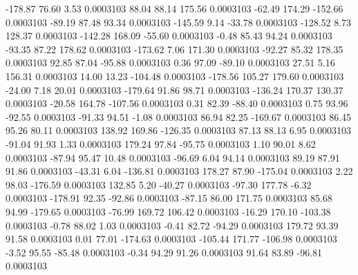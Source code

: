      -178.87       76.60        3.53     0.0003103
       88.04       88.14      175.56     0.0003103
      -62.49      174.29     -152.66     0.0003103
      -89.19       87.48       93.34     0.0003103
     -145.59        9.14      -33.78     0.0003103
     -128.52        8.73      128.37     0.0003103
     -142.28      168.09      -55.60     0.0003103
       -0.48       85.43       94.24     0.0003103
      -93.35       87.22      178.62     0.0003103
     -173.62        7.06      171.30     0.0003103
      -92.27       85.32      178.35     0.0003103
       92.85       87.04      -95.88     0.0003103
        0.36       97.09      -89.10     0.0003103
       27.51        5.16      156.31     0.0003103
       14.00       13.23     -104.48     0.0003103
     -178.56      105.27      179.60     0.0003103
      -24.00        7.18       20.01     0.0003103
     -179.64       91.86       98.71     0.0003103
     -136.24      170.37      130.37     0.0003103
      -20.58      164.78     -107.56     0.0003103
        0.31       82.39      -88.40     0.0003103
        0.75       93.96      -92.55     0.0003103
      -91.33       94.51       -1.08     0.0003103
       86.94       82.25     -169.67     0.0003103
       86.45       95.26       80.11     0.0003103
      138.92      169.86     -126.35     0.0003103
       87.13       88.13        6.95     0.0003103
      -91.04       91.93        1.33     0.0003103
      179.24       97.84      -95.75     0.0003103
        1.10       90.01        8.62     0.0003103
      -87.94       95.47       10.48     0.0003103
      -96.69        6.04       94.14     0.0003103
       89.19       87.91       91.86     0.0003103
      -43.31        6.04     -136.81     0.0003103
      178.27       87.90     -175.04     0.0003103
        2.22       98.03     -176.59     0.0003103
      132.85        5.20      -40.27     0.0003103
      -97.30      177.78       -6.32     0.0003103
     -178.91       92.35      -92.86     0.0003103
      -87.15       86.00      171.75     0.0003103
       85.68       94.99     -179.65     0.0003103
      -76.99      169.72      106.42     0.0003103
      -16.29      170.10     -103.38     0.0003103
       -0.78       88.02        1.03     0.0003103
       -0.41       82.72      -94.29     0.0003103
      179.72       93.39       91.58     0.0003103
        0.01       77.01     -174.63     0.0003103
     -105.44      171.77     -106.98     0.0003103
       -3.52       95.55      -85.48     0.0003103
       -0.34       94.29       91.26     0.0003103
       91.64       83.89      -96.81     0.0003103
